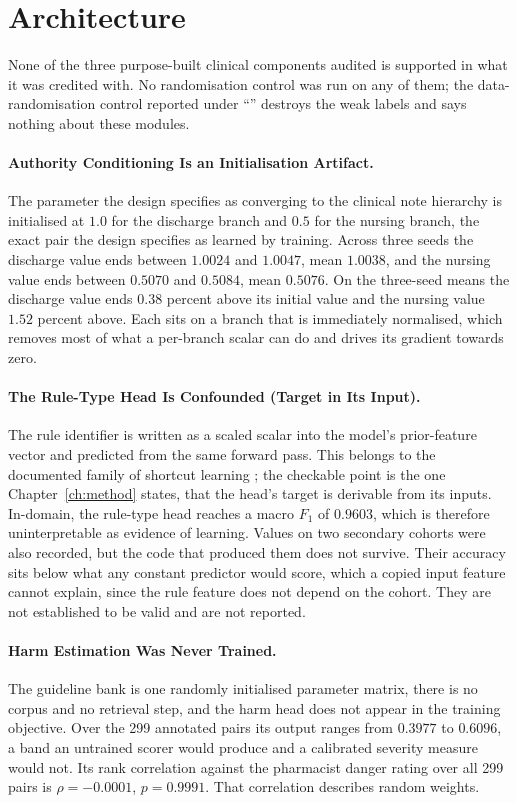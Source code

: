 \section{Architecture}
\label{sec:res-rq3}

None of the three purpose-built clinical components audited is supported in what it
was credited with. No randomisation control was run on any of them; the
data-randomisation control reported under ``'' destroys the
weak labels and says nothing about these modules. 

\paragraph{Authority Conditioning Is an Initialisation Artifact.} The parameter
the design specifies as converging to the clinical note hierarchy is initialised
at $1.0$ for the discharge branch and $0.5$ for the nursing branch, the exact
pair the design specifies as learned by training. Across three seeds the discharge value
ends between $1.0024$ and $1.0047$, mean $1.0038$, and the nursing value ends
between $0.5070$ and $0.5084$, mean $0.5076$. On the three-seed means the
discharge value ends $0.38$ percent above its initial value and the nursing value
$1.52$ percent above. Each sits on a branch that is
immediately normalised, which removes most of what a per-branch scalar can do
and drives its gradient towards zero.

\paragraph{The Rule-Type Head Is Confounded (Target in Its Input).} The rule identifier is written
as a scaled scalar into the model's prior-feature vector and predicted from the
same forward pass. This belongs to
the documented family of shortcut learning \citep{geirhos2020shortcut,
zech2018generalization}; the checkable point is the one Chapter~\ref{ch:method} states, that the head's target is derivable from its inputs. In-domain, the
rule-type head reaches a macro $F_1$ of $0.9603$, which is therefore
uninterpretable as evidence of learning. Values on two
secondary cohorts were also recorded, but the code that produced them does not
survive. Their accuracy sits below what any constant predictor would score,
which a copied input feature cannot explain, since the rule feature does not
depend on the cohort. They are not established to be valid and are not
reported.

\paragraph{Harm Estimation Was Never Trained.} The guideline bank is one randomly
initialised parameter matrix, there is no corpus and no retrieval step, and the
harm head does not appear in the training objective. Over the 299 annotated
pairs its output ranges from $0.3977$ to $0.6096$, a band
an untrained scorer would produce and a calibrated severity measure would not.
Its rank correlation against the pharmacist danger rating over all 299 pairs is
$\rho = -0.0001$, $p = 0.9991$. That
correlation describes random weights.

